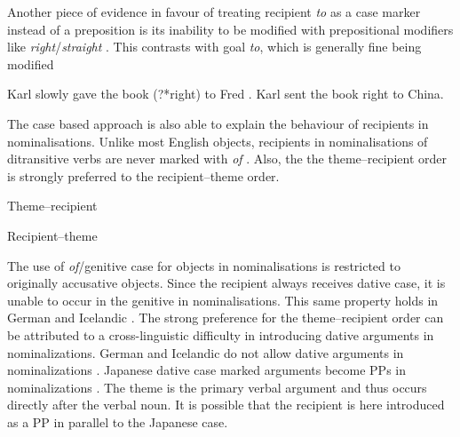 Another piece of evidence in favour of treating recipient \textit{to} as a case marker instead of a preposition is its inability to be modified with prepositional modifiers like \textit{right}/\textit{straight} \citep{Rooryck.1996b}. This contrasts with goal \textit{to}, which is generally fine being modified

\begin{exe}
\ex Karl slowly gave the book (?*right) to Fred \citep[ex 1a]{Rooryck.1996b}.
\ex Karl sent the book right to China.
\end{exe}

The case based approach is also able to explain the behaviour of recipients in nominalisations. Unlike most English objects, recipients in nominalisations of ditransitive verbs are never marked with \textit{of} \citep{Kayne.1984}. Also, the the theme--recipient order is strongly preferred to the recipient--theme order.

\begin{exe}
\ex Theme--recipient
\begin{xlist}
\end{xlist}
\newpage
\ex Recipient--theme
\begin{xlist}
\end{xlist}
\end{exe}

The use of \textit{of}/genitive case for objects in nominalisations is restricted to originally accusative objects. Since the recipient always receives dative case, it is unable to occur in the genitive in nominalisations. This same property holds in German and Icelandic \citep{Maling.2001}. The strong preference for the theme--recipient order can be attributed to a cross-linguistic difficulty in introducing dative arguments in nominalizations. German and Icelandic do not allow dative arguments in nominalizations \citep{Maling.2001,McFadden.2006}. Japanese dative case marked arguments become PPs in nominalizations \citep{Kishimoto.2008}. The theme is the primary verbal argument and thus occurs directly after the verbal noun. It is possible that the recipient is here introduced as a PP in parallel to the Japanese case.

